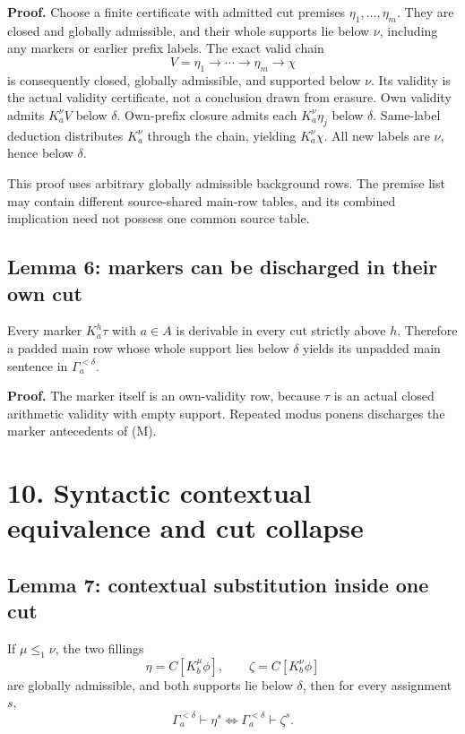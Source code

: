 \documentclass[
  11pt,
  letterpaper,
]{article}
\begin{document}
\textbf{Proof.} Choose a finite certificate with admitted cut premises
\(\eta_1,\ldots,\eta_m\). They are closed and globally admissible, and
their whole supports lie below \(\nu\), including any markers or earlier
prefix labels. The exact valid chain \[
V=\eta_1\to\cdots\to\eta_m\to\chi
\] is consequently closed, globally admissible, and supported below
\(\nu\). Its validity is the actual validity certificate, not a
conclusion drawn from erasure. Own validity admits \(K_a^\nu V\) below
\(\delta\). Own-prefix closure admits each \(K_a^\nu\eta_j\) below
\(\delta\). Same-label deduction distributes \(K_a^\nu\) through the
chain, yielding \(K_a^\nu\chi\). All new labels are \(\nu\), hence below
\(\delta\).

This proof uses arbitrary globally admissible background rows. The
premise list may contain different source-shared main-row tables, and
its combined implication need not possess one common source table.

\subsection{Lemma 6: markers can be discharged in their own
cut}\label{lemma-6-markers-can-be-discharged-in-their-own-cut}

Every marker \(K_a^h\tau\) with \(a\in A\) is derivable in every cut
strictly above \(h\). Therefore a padded main row whose whole support
lies below \(\delta\) yields its unpadded main sentence in
\(\Gamma_a^{<\delta}\).

\textbf{Proof.} The marker itself is an own-validity row, because
\(\tau\) is an actual closed arithmetic validity with empty support.
Repeated modus ponens discharges the marker antecedents of (M).

\section{10. Syntactic contextual equivalence and cut
collapse}\label{syntactic-contextual-equivalence-and-cut-collapse}

\subsection{Lemma 7: contextual substitution inside one
cut}\label{lemma-7-contextual-substitution-inside-one-cut}

If \(\mu\leq_1\nu\), the two fillings \[
\eta=C[K_b^\mu\phi],\qquad
\zeta=C[K_b^\nu\phi]
\] are globally admissible, and both supports lie below \(\delta\), then
for every assignment \(s\), \[
\Gamma_a^{<\delta}\vdash\eta^s
\iff
\Gamma_a^{<\delta}\vdash\zeta^s.
\tag{1}
\]
\end{document}
